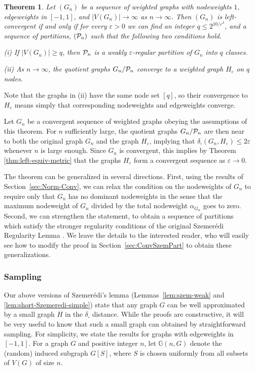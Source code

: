 \documentclass[12pt]{article}
\newtheorem{theorem}{Theorem}[section]
\numberwithin{equation}{section}
\def\eps{\varepsilon}
\def\RandG{{\mathbb G}}
\def\PP{{\cal P}}\def\QQ{{\cal Q}}\def\RR{{\cal R}}
\begin{document}
\begin{theorem}
\label{thm:Szem-Uniform} Let $(G_n)$ be a sequence of weighted
graphs with nodeweights $1$, edgeweights in $[-1,1]$, and
$|V(G_n)|\to\infty$ as $n\to\infty$.  Then $(G_n)$ is
left-convergent if and only if for every $\eps>0$ we can find an
integer $q\leq 2^{10/\eps^2}$, and a sequence of partitions,
$(\PP_n)$ such that the following two conditions hold.

(i) If $|V(G_n)|\geq q$, then $\PP_n$ is a weakly $\eps$-regular
partition of $G_n$ into $q$ classes.

(ii) As $n\to\infty$, the quotient graphs $G_n/\PP_n$ converge to a
weighted graph $H_\eps$ on $q$ nodes.
\end{theorem}

Note that the graphs in (ii) have the same node set $[q]$, so their
convergence to $H_\eps$ means simply that corresponding nodeweights and
edgeweights converge.

Let $G_n$ be a convergent sequence of weighted graphs obeying the
assumptions of this theorem. For $n$ sufficiently large, the quotient
graphs $G_n/\PP_n$ are then near to both the original graph $G_n$ and
the graph $H_\eps$, implying that $\delta_\square(G_n,H_\eps)\leq
2\eps$ whenever $n$ is large enough. Since $G_n$ is convergent, this
implies by Theorem \ref{thm:left-equiv-metric} that the graphs
$H_\eps$ form a convergent sequence as $\eps\to0$.

The theorem can be generalized in several directions.  First, using
the results of Section~\ref{sec:Norm-Conv}, we can relax the
condition on the nodeweights of $G_n$ to require only that $G_n$ has
no dominant nodeweights in the sense that the maximum nodeweight of
$G_n$ divided by the total nodeweight $\alpha_{G_n}$ goes to zero.
Second, we can strengthen the statement, to obtain a sequence of
partitions which satisfy the stronger regularity conditions of the
original Szemer\'edi Regularity Lemma \cite{Szem}.
We leave the details to the interested
reader, who will easily see how to modify the proof in
Section~\ref{sec:ConvSzemPart} to obtain these generalizations.

\subsubsection{Sampling}

Our above versions of Szemer\'edi's lemma (Lemmas~\ref{lem:szem-weak}
and \ref{lem:short-Szemeredi-simple}) state that any graph $G$ can be
well approximated by a small graph $H$ in the $\delta_\square$
distance.
While the proofs are
constructive, it will be very useful to know that such a small graph
can obtained by straightforward sampling. For simplicity, we state
the results for graphs with edgeweights in $[{-1},1]$. For a
graph $G$ and positive integer $n$, let $\RandG(n,G)$ denote the
(random) induced subgraph $G[S]$, where $S$ is chosen uniformly from
all subsets of $V(G)$ of size $n$.
\end{document}
